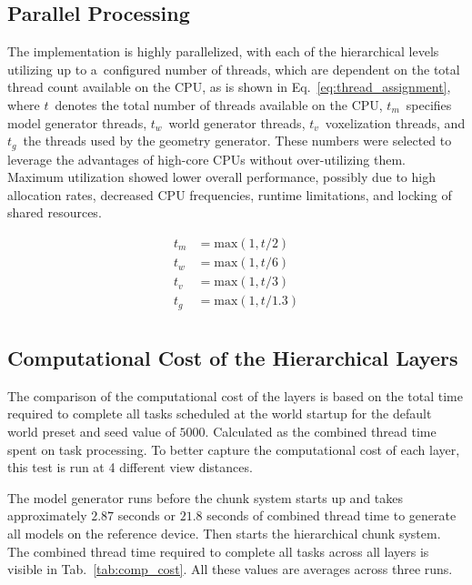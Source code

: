 \subsection{Parallel Processing}

The implementation is highly parallelized, with each of the hierarchical levels utilizing up to a~configured number of threads, which are dependent on the total thread count available on the CPU, as is shown in Eq.~\ref{eq:thread_assignment}, where $t$~denotes the total number of threads available on the CPU, $t_m$~specifies model generator threads, $t_w$~world generator threads, $t_v$~voxelization threads, and $t_g$~the threads used by the geometry generator. These numbers were selected to leverage the advantages of high-core CPUs without over-utilizing them. Maximum utilization showed lower overall performance, possibly due to high allocation rates, decreased CPU frequencies, runtime limitations, and locking of shared resources.

\begin{equation}\label{eq:thread_assignment}
    \begin{aligned}
        t_m &= \text{max}\left(1, t/2\right) \\
        t_w &= \text{max}\left(1, t/6\right) \\
        t_v &= \text{max}\left(1, t/3\right) \\
        t_g &= \text{max}\left(1, t/1.3\right) \\
    \end{aligned}
\end{equation}

\subsection{Computational Cost of the Hierarchical Layers}

The comparison of the computational cost of the layers is based on the total time required to complete all tasks scheduled at the world startup for the default world preset and seed value of $5000$. Calculated as the combined thread time spent on task processing. To better capture the computational cost of each layer, this test is run at 4 different view distances.

The model generator runs before the chunk system starts up and takes approximately $2.87$ seconds or $21.8$ seconds of combined thread time to generate all models on the reference device. Then starts the hierarchical chunk system. The combined thread time required to complete all tasks across all layers is visible in Tab.~\ref{tab:comp_cost}. All these values are averages across three runs.

